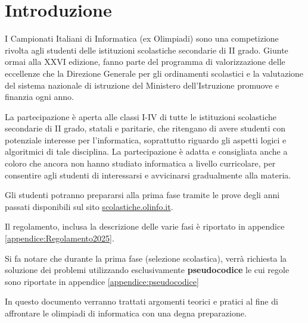 
\chapter*{Introduzione}

I Campionati Italiani di Informatica (ex Olimpiadi) sono una competizione rivolta agli studenti delle istituzioni 
scolastiche secondarie di II grado. Giunte ormai alla XXVI edizione, fanno parte del programma di 
valorizzazione delle eccellenze che la Direzione Generale per gli ordinamenti scolastici e la valutazione del 
sistema nazionale di istruzione del Ministero dell’Istruzione promuove e finanzia ogni anno.

La partecipazione è aperta alle classi I-IV di tutte le istituzioni scolastiche secondarie di II grado, 
statali e paritarie, che ritengano di avere studenti con potenziale interesse per l'informatica, 
soprattutto riguardo gli aspetti logici e algoritmici di tale disciplina. La partecipazione è adatta e 
consigliata anche a coloro che ancora non hanno studiato informatica a livello curricolare, per 
consentire agli studenti di interessarsi e avvicinarsi gradualmente alla materia. 

Gli studenti potranno prepararsi alla prima fase tramite le prove degli anni passati disponibili sul sito 
\url{scolastiche.olinfo.it}.

Il regolamento, inclusa la descrizione delle varie fasi è riportato in appendice \ref{appendice:Regolamento2025}.

Si fa notare che durante la prima fase (selezione scolastica), verrà richiesta la soluzione dei problemi utilizzando esclusivamente \textbf{pseudocodice} le cui regole sono riportate in appendice \ref{appendice:pseudocodice}


In questo documento verranno trattati argomenti teorici e pratici al fine di affrontare le olimpiadi di informatica con una degna preparazione.